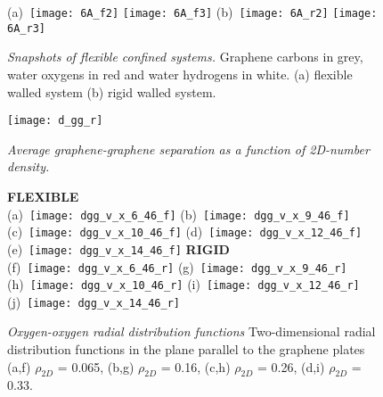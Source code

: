 \documentclass[12pt]{article}
\begin{document}
\begin{figure}[h!]
	\centering
	(a)~\texttt{[image: 6A\_f2]} 
	\texttt{[image: 6A\_f3]}
	(b)~\texttt{[image: 6A\_r2]} 
	\texttt{[image: 6A\_r3]}
	\caption{\textit{Snapshots of flexible confined systems.} Graphene carbons in grey, water oxygens in red and water hydrogens in white. (a) flexible walled system (b) rigid walled system. }
	\label{fig:snapshot}
\end{figure}

\begin{figure}[h!]
	\centering
	\texttt{[image: d\_gg\_r]} 
	\caption{\textit{Average graphene-graphene separation as a function of 2D-number density.}}
	\label{fig:dgg}
\end{figure}

\begin{figure}[h!]
	\centering
	\textbf{FLEXIBLE} \\
	(a)~\texttt{[image: dgg\_v\_x\_6\_46\_f]} 
	(b)~\texttt{[image: dgg\_v\_x\_9\_46\_f]}
	(c)~\texttt{[image: dgg\_v\_x\_10\_46\_f]}
	(d)~\texttt{[image: dgg\_v\_x\_12\_46\_f]}
	(e)~\texttt{[image: dgg\_v\_x\_14\_46\_f]}
	\textbf{RIGID} \\
	(f)~\texttt{[image: dgg\_v\_x\_6\_46\_r]} 
	(g)~\texttt{[image: dgg\_v\_x\_9\_46\_r]}
	(h)~\texttt{[image: dgg\_v\_x\_10\_46\_r]}
	(i)~\texttt{[image: dgg\_v\_x\_12\_46\_r]}
	(j)~\texttt{[image: dgg\_v\_x\_14\_46\_r]}
	\caption{\textit{Oxygen-oxygen radial distribution functions} Two-dimensional radial distribution functions in the plane parallel to the graphene plates (a,f) \(\rho_{2D}\) = 0.065, (b,g) \(\rho_{2D}\) = 0.16, (c,h) \(\rho_{2D}\) = 0.26, (d,i) \(\rho_{2D}\) = 0.33.}
	\label{fig:density_vs_dgg}
\end{figure}
\end{document}
